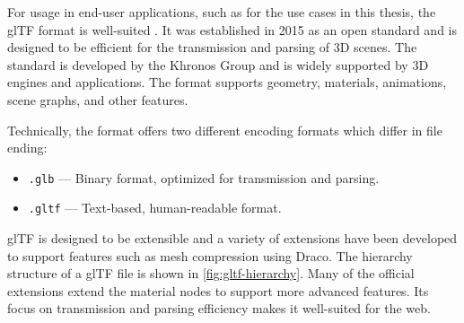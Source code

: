 For usage in end-user applications, such as for the use cases in this thesis, the \gls{glTF} format is well-suited \cite{gltfSpecification}. It was established in 2015 as an open standard and is designed to be efficient for the transmission and parsing of 3D scenes. The standard is developed by the \gls{Khronos Group} and is widely supported by 3D engines and applications. The format supports geometry, materials, animations, scene graphs, and other features.

Technically, the format offers two different encoding formats which differ in file ending:

\begin{itemize}
  \item{\texttt{.glb}} — Binary format, optimized for transmission and parsing.
  \item{\texttt{.gltf}} — Text-based, human-readable format.
\end{itemize}

\gls{glTF} is designed to be extensible and a variety of extensions have been developed to support features such as mesh compression using Draco. The hierarchy structure of a \gls{glTF} file is shown in \autoref{fig:gltf-hierarchy}. Many of the official extensions extend the material nodes to support more advanced features. Its focus on transmission and parsing efficiency makes it well-suited for the web.

